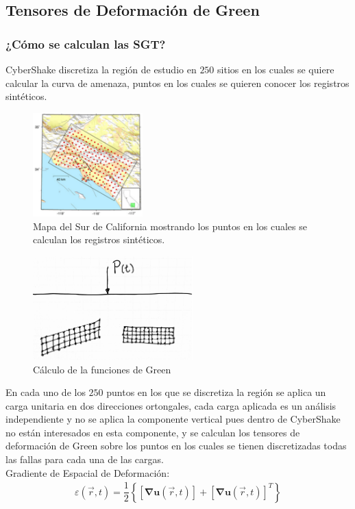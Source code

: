 \documentclass{beamer}
\begin{document}
\subsection{Tensores de Deformación de Green}
\begin{frame}[allowframebreaks]
\frametitle{¿Cómo se calculan las SGT?}
%
\justifying
%
CyberShake discretiza la región de estudio en $250$ sitios en los cuales se quiere calcular la curva de amenaza, puntos en los cuales se quieren conocer los registros sintéticos.
%
\begin{figure}[h]
	\centering
	\includegraphics[height=4cm]{img/Discretizacion.pdf}
	\caption{Mapa del Sur de California mostrando los puntos en los cuales se calculan los registros sintéticos. \cite[figura 1, página 3]{gravesetal}}
	\vspace{-.5 cm}
\end{figure}
%
%
\begin{figure}[h]
	\centering
	\includegraphics[height=4cm]{img/SGT.pdf}
	\caption{Cálculo de la funciones de Green}
	\vspace{-.5 cm}
\end{figure}
%
%
En cada uno de los $250$ puntos en los que se discretiza la región se aplica un carga unitaria en dos direcciones ortongales, cada carga aplicada es un análisis independiente y no se aplica la componente vertical pues dentro de CyberShake no están interesados en esta componente, y se calculan los tensores de deformación de Green sobre los puntos en los cuales se tienen discretizadas todas las fallas para cada una de las cargas.\\
%
Gradiente de Espacial de Deformación:
%
\begin{align*}
	\varepsilon \left( \vec{r}, t \right) = \dfrac{1}{2} \left\lbrace \left[ \mathbf{\nabla u } \left( \vec{r}, t \right) \right] + \left[ \mathbf{\nabla u} \left( \vec{r}, t \right) \right]^T \right\rbrace

\end{align*}
\end{frame}
\end{document}
